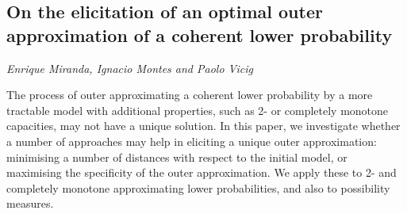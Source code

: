 \documentclass[../booklet.tex]{subfiles}
\begin{document}
\subsection[On the elicitation of an optimal outer approximation of a coherent lower probability. {\it Enrique Miranda, Ignacio Montes and Paolo Vicig}]{On the elicitation of an optimal outer approximation of a coherent lower probability}
  

\begin{center}
  {\it Enrique Miranda, Ignacio Montes and Paolo Vicig}
\end{center}

\vskip 0.8cm


The process of outer approximating a coherent lower probability by a more tractable model with additional properties, such as 2- or completely monotone capacities, may not have a unique solution. In this paper, we investigate whether a number of approaches may help in eliciting a unique outer approximation: minimising a number of distances with respect to the initial model, or maximising the specificity of the outer approximation. We apply these to 2- and completely monotone approximating lower probabilities, and also to possibility measures.

\end{document}
